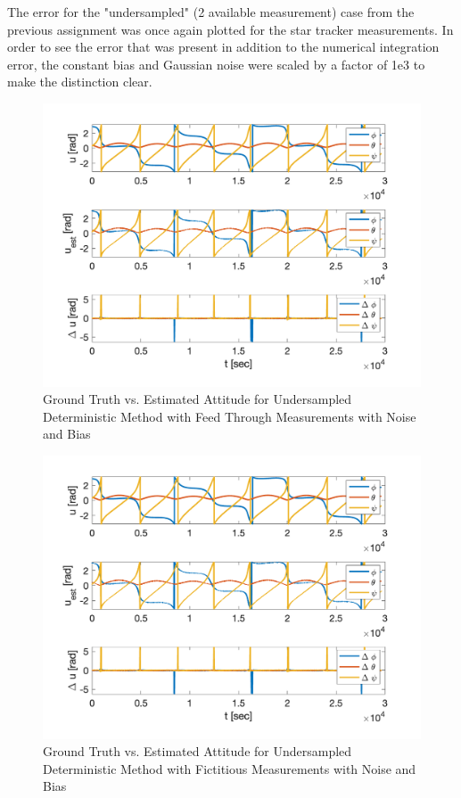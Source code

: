 The error for the "undersampled" (2 available measurement) case from the previous assignment was once again plotted for the star tracker measurements. In order to see the error that was present in addition to the numerical integration error, the constant bias and Gaussian noise were scaled by a factor of 1e3 to make the distinction clear. 

\begin{figure}[H]
    \centering
    \captionsetup{ justification = centering }
    \includegraphics[width = 12cm]{Images/PS7/attitude_estimation_undersampled_det_default.png}
    \caption{Ground Truth vs. Estimated Attitude for Undersampled Deterministic Method with Feed Through Measurements with Noise and Bias}
    \label{fig:det_attitude_undersampled_default_noise}
\end{figure}

\begin{figure}[H]
    \centering
    \captionsetup{ justification = centering }
    \includegraphics[width = 12cm]{Images/PS7/attitude_estimation_undersampled_det_fictitious.png}
    \caption{Ground Truth vs. Estimated Attitude for Undersampled Deterministic Method with Fictitious Measurements with Noise and Bias}
    \label{fig:det_attitude_undersampled_fictitious_noise}
\end{figure}

